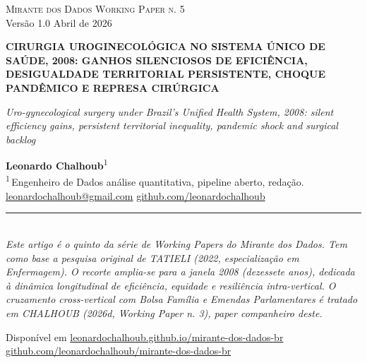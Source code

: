 \documentclass[12pt,a4paper,oneside]{article}
\begin{document}
\begin{titlepage}
  \begin{center}
    \vspace*{1.5cm}
    {\small\textsc{Mirante dos Dados \quad\textbar\quad Working Paper n. 5}}\\
    {\small Versão 1.0 \textemdash{} Abril de 2026}

    \vfill

    {\LARGE\bfseries
     CIRURGIA UROGINECOLÓGICA NO SISTEMA
     ÚNICO DE SAÚDE, 2008:
     GANHOS SILENCIOSOS DE EFICIÊNCIA,
     DESIGUALDADE TERRITORIAL PERSISTENTE,
     CHOQUE PANDÊMICO E REPRESA CIRÚRGICA}

    \vspace{1cm}
    {\large\itshape
     Uro-gynecological surgery under Brazil's Unified Health System,
     2008: silent efficiency gains, persistent
     territorial inequality, pandemic shock and surgical backlog}

    \vfill

    {\large\textbf{Leonardo Chalhoub}\textsuperscript{1}}\\[6pt]
    {\small\textsuperscript{1}\,Engenheiro de Dados \textemdash{}
     análise quantitativa, pipeline aberto, redação.}\\[6pt]
    {\small\href{mailto:leonardochalhoub@gmail.com}{leonardochalhoub@gmail.com}
     \quad\textbullet\quad
     \href{https://github.com/leonardochalhoub}{github.com/leonardochalhoub}}

    \vfill

    \rule{0.6\linewidth}{0.4pt}\\[6pt]
    {\small\textit{Este artigo é o quinto da série de Working Papers
     do Mirante dos Dados. Tem como base a pesquisa original de
     TATIELI (2022, especialização em Enfermagem). O recorte
     amplia-se para a janela 2008 (dezessete anos),
     dedicada à dinâmica longitudinal de eficiência, equidade e
     resiliência \textit{intra-vertical}. O cruzamento
     \textit{cross-vertical} com Bolsa Família e Emendas
     Parlamentares é tratado em CHALHOUB (2026d, Working Paper n. 3),
     paper companheiro deste.}}

    \vspace{1cm}
    {\footnotesize
     Disponível em
     \href{https://leonardochalhoub.github.io/mirante-dos-dados-br/}%
     {leonardochalhoub.github.io/mirante-dos-dados-br}}\\[2pt]
    {\footnotesize
     \href{https://github.com/leonardochalhoub/mirante-dos-dados-br}%
     {github.com/leonardochalhoub/mirante-dos-dados-br}}
  \end{center}
\end{titlepage}
\end{document}
